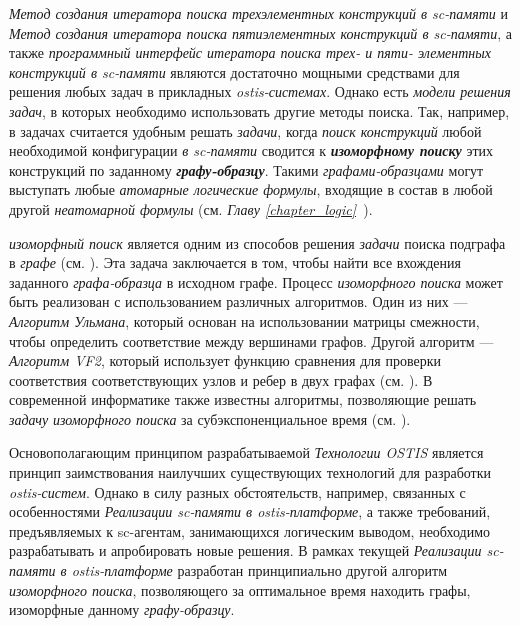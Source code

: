 \textit{Метод создания итератора поиска трехэлементных конструкций в sc-памяти} и \textit{Метод создания итератора поиска пятиэлементных конструкций в sc-памяти}, а также \textit{программный интерфейс итератора поиска трех- и пяти- элементных конструкций в sc-памяти} являются достаточно мощными средствами для решения любых задач  в прикладных \textit{ostis-системах}. Однако есть \textit{модели решения задач}, в которых необходимо использовать другие методы поиска. Так, например, в задачах  считается удобным решать \textit{задачи}, когда \textit{поиск конструкций} любой необходимой конфигурации \textit{в sc-памяти} сводится к \textbf{\textit{изоморфному поиску}} этих конструкций по заданному \textbf{\textit{графу-образцу}}. Такими \textit{графами-образцами} могут выступать любые \textit{атомарные логические формулы}, входящие в состав в любой другой \textit{неатомарной формулы} (см. \textit{Главу \ref{chapter_logic}~}).

\textit{изоморфный поиск} является одним из способов решения \textit{задачи} поиска подграфа в \textit{графе} (см. ). Эта задача заключается в том, чтобы найти все вхождения заданного \textit{графа-образца} в исходном графе. Процесс \textit{изоморфного поиска} может быть реализован с использованием различных алгоритмов. Один из них --- \textit{Алгоритм Ульмана}, который основан на использовании матрицы смежности, чтобы определить соответствие между вершинами графов. Другой алгоритм --- \textit{Алгоритм VF2}, который использует функцию сравнения для проверки соответствия соответствующих узлов и ребер в двух графах (см. ). В современной информатике также известны алгоритмы, позволяющие решать \textit{задачу} \textit{изоморфного поиска} за субэкспоненциальное время (см. ).

Основополагающим принципом разрабатываемой \textit{Технологии OSTIS} является принцип заимствования наилучших существующих технологий для разработки \textit{ostis-систем}. Однако в силу разных обстоятельств, например, связанных с особенностями \textit{Реализации sc-памяти в ostis-платформе}, а также требований, предъявляемых к sc-агентам, занимающихся логическим выводом, необходимо разрабатывать и апробировать новые решения. В рамках текущей \textit{Реализации sc-памяти в ostis-платформе} разработан принципиально другой алгоритм \textit{изоморфного поиска}, позволяющего за оптимальное время находить графы, изоморфные данному \textit{графу-образцу}.


